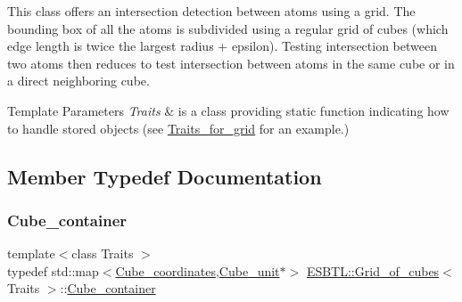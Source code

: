 This class offers an intersection detection between atoms using a grid. The bounding box of all the atoms is subdivided using a regular grid of cubes (which edge length is twice the largest radius + epsilon). Testing intersection between two atoms then reduces to test intersection between atoms in the same cube or in a direct neighboring cube. 
\begin{DoxyTemplParams}{Template Parameters}
{\em Traits} & is a class providing static function indicating how to handle stored objects (see \hyperlink{structESBTL_1_1Traits__for__grid}{Traits\+\_\+for\+\_\+grid} for an example.) \\
\hline
\end{DoxyTemplParams}


\subsection{Member Typedef Documentation}
\mbox{\label{structESBTL_1_1Grid__of__cubes_aaa528fd99e0133f58e9f5bb09925a036}} 
\subsubsection{\texorpdfstring{Cube\+\_\+container}{Cube\_container}}
{\footnotesize\ttfamily template$<$class Traits $>$ \\
typedef std\+::map$<$\hyperlink{structESBTL_1_1Grid__of__cubes_ad55c84346bab961e08d95e494551d07d}{Cube\+\_\+coordinates},\hyperlink{structESBTL_1_1Grid__of__cubes_1_1Cube__unit}{Cube\+\_\+unit}$\ast$$>$ \hyperlink{structESBTL_1_1Grid__of__cubes}{E\+S\+B\+T\+L\+::\+Grid\+\_\+of\+\_\+cubes}$<$ Traits $>$\+::\hyperlink{structESBTL_1_1Grid__of__cubes_aaa528fd99e0133f58e9f5bb09925a036}{Cube\+\_\+container}}

\mbox{\label{structESBTL_1_1Grid__of__cubes_ad55c84346bab961e08d95e494551d07d}} 
